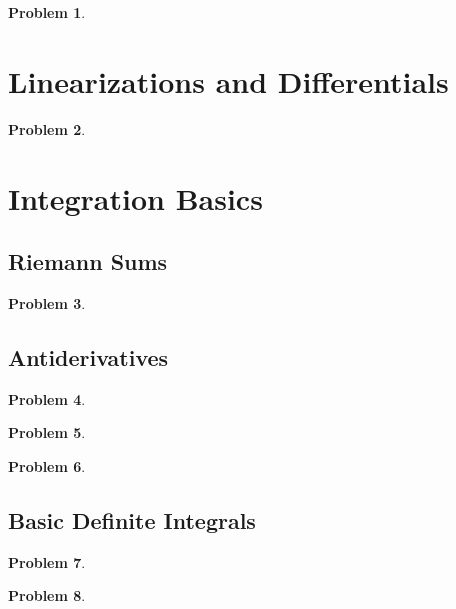 \documentclass{article}
\newtheorem{problem}{Problem}
\begin{document}
\begin{problem}

\end{problem}

\section{Linearizations and Differentials} \label{secMPSLinearizationAndDifferentials}
\begin{problem}

\end{problem}


\section{Integration Basics}
\subsection{Riemann Sums}\label{secMPSRiemannSums}
\begin{problem}

\end{problem}


\subsection{Antiderivatives}\label{secMPSantiderivatives}
\begin{problem}

\end{problem}
\begin{problem}

\end{problem}
\begin{problem}

\end{problem}

\subsection{Basic Definite Integrals} \label{secMPSBasicDefiniteIntegrals}
\begin{problem}

\end{problem}

\begin{problem}

\end{problem}
\end{document}
